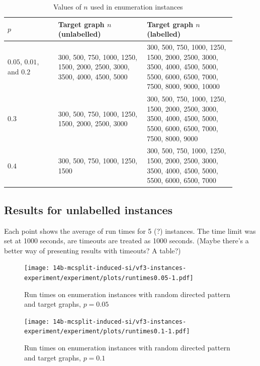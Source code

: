 \begin{table}[h!]
\centering
\footnotesize
 \begin{tabular}{p{0.2\linewidth} p{0.35\linewidth} p{0.35\linewidth}}
 \toprule
     $p$ & Target graph $n$ (unlabelled) & Target graph $n$ (labelled) \\ [0.5ex]
 \midrule
     $0.05$, $0.01$, and $0.2$ &
         300, 500, 750, 1000, 1250, 1500, 2000, 2500, 3000, 3500, 4000, 4500, 5000 &
         300, 500, 750, 1000, 1250, 1500, 2000, 2500, 3000, 3500, 4000, 4500, 5000,
         5500, 6000, 6500, 7000, 7500, 8000, 9000, 10000\\
     \rule{0pt}{2.3ex}$0.3$ & 
        300, 500, 750, 1000, 1250, 1500, 2000, 2500, 3000 &
        300, 500, 750, 1000, 1250, 1500, 2000, 2500, 3000, 3500, 4000, 4500, 5000,
        5500, 6000, 6500, 7000, 7500, 8000, 9000 \\
     \rule{0pt}{2.3ex}$0.4$ & 300, 500, 750, 1000, 1250, 1500 &
        300, 500, 750, 1000, 1250, 1500, 2000, 2500, 3000, 3500, 4000, 4500, 5000, 5500, 6000, 6500, 7000 \\
 \bottomrule
\end{tabular}
\caption{Values of $n$ used in enumeration instances}
\label{tab:carletti-n}
\end{table}

\subsection{Results for unlabelled instances}

Each point shows the average of run times for 5 (?) instances.  The time limit was set at 1000 seconds, are timeouts are treated as 1000 seconds.  (Maybe there's a better way of presenting results with timeouts? A table?)

\begin{figure}[h!]
    \centering
    \texttt{[image: 14b-mcsplit-induced-si/vf3-instances-experiment/experiment/plots/runtimes0.05-1.pdf]}
    \caption{Run times on enumeration instances with random directed pattern and target graphs, $p=0.05$}
    \label{figure:TODO}
\end{figure}

\begin{figure}[h!]
    \centering
    \texttt{[image: 14b-mcsplit-induced-si/vf3-instances-experiment/experiment/plots/runtimes0.1-1.pdf]}
    \caption{Run times on enumeration instances with random directed pattern and target graphs, $p=0.1$}
    \label{figure:TODO}
\end{figure}

